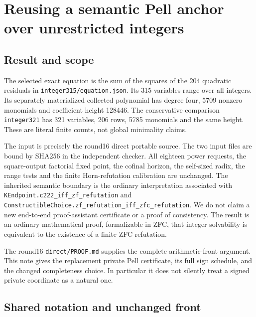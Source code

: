 \section{Reusing a semantic Pell anchor over unrestricted integers}



\subsection{Result and scope}



The selected exact equation is the sum of the squares of the 204 quadratic residuals in \texttt{integer315/\allowbreak{}equation.json}. Its 315 variables range over all integers. Its separately materialized collected polynomial has degree four, 5709 nonzero monomials and coefficient height 128446. The conservative comparison \texttt{integer321} has 321 variables, 206 rows, 5785 monomials and the same height. These are literal finite counts, not global minimality claims.



The input is precisely the round16 direct portable source. The two input files are bound by SHA256 in the independent checker. All eighteen power requests, the square-output factorial fixed point, the cofinal horizon, the self-sized radix, the range tests and the finite Horn-refutation calibration are unchanged. The inherited semantic boundary is the ordinary interpretation associated with \texttt{KEndpoint.c222\_\allowbreak{}iff\_\allowbreak{}zf\_\allowbreak{}refutation} and \texttt{ConstructibleChoice.zf\_\allowbreak{}refutation\_\allowbreak{}iff\_\allowbreak{}zfc\_\allowbreak{}refutation}. We do not claim a new end-to-end proof-assistant certificate or a proof of consistency. The result is an ordinary mathematical proof, formalizable in ZFC, that integer solvability is equivalent to the existence of a finite ZFC refutation.



The round16 \texttt{direct/\allowbreak{}PROOF.md} supplies the complete arithmetic-front argument. This note gives the replacement private Pell certificate, its full sign schedule, and the changed completeness choice. In particular it does not silently treat a signed private coordinate as a natural one.



\subsection{Shared notation and unchanged front}



